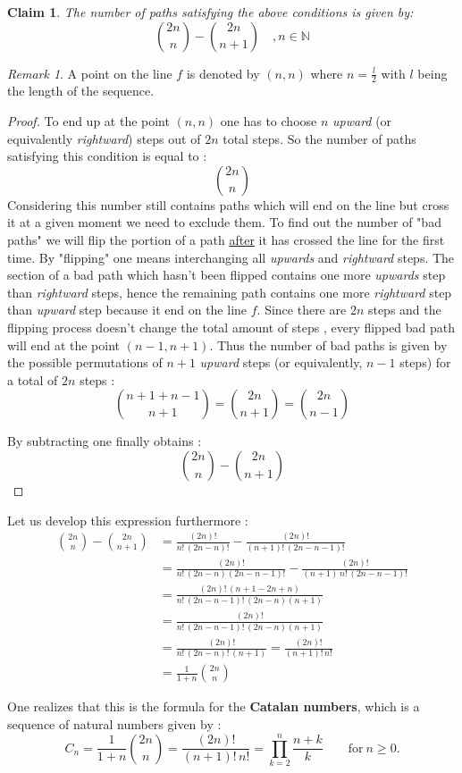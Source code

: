 \documentclass[a4paper,13pt,oneside]{article}
\newtheorem*{claim}{Claim}
\theoremstyle{remark}
\newtheorem*{remark}{Remark}
\begin{document}
\begin{claim} \label{claim}
The number of paths satisfying the above conditions is given by:
\[
\boxed{\binom{2n}{n} - \binom{2n}{n+1}  \quad ,n\in \mathbb{N}}
\]	
\end{claim}
\bigskip
\begin{remark}
A point on the line $f$ is denoted by $(n,n)$ where $n =\frac{l}{2}$ with $l$ being the length of the sequence.
\end{remark}
\bigskip
\begin{proof}
To end up at the point $(n,n)$ one has to choose $n$ \textit{upward} (or equivalently \textit{rightward}) steps out of $2n$ total steps. So the number of paths satisfying this condition is equal to : 
\[\binom{2n}{n}\] 
Considering this number still contains paths which will end on the line but cross it at a given moment we need to exclude them.
To find out the number of "bad paths" we will flip the portion of a path \underline{after}  it has crossed the line for the first time. By "flipping" one means interchanging all  \textit{upwards} and \textit{rightward} steps.
The section of a bad path which hasn't been flipped contains one more \textit{upwards} step than \textit{rightward} steps, hence the remaining path contains one more \textit{rightward} step than \textit{upward} step because it end on the line $f$. Since there are $2n$ steps and the flipping process doesn't change the total amount of steps , every flipped bad path will end at the point $(n-1,n+1)$.
Thus the number of bad paths is given by the possible permutations of $n+1$ \textit{upward} steps (or equivalently, $n-1$  steps)  for a total of $2n$ steps : 
\[
\binom{n+1+n-1}{n+1} =\binom{2n}{n+1}= \binom{2n}{n-1}
\]

By subtracting  one finally obtains :
\[
\binom{2n}{n} - \binom{2n}{n+1}
\]


\end{proof}
\bigskip

Let us develop this expression furthermore :
\begin{align*}
\binom{2n}{n} - \binom{2n}{n+1} &= \frac{(2n)!}{n! \, (2n-n)!} - \frac{(2n)!}{(n+1)! \, (2n-n-1)!}\\
&= \frac{(2n)!}{n! \, (2n-n)(2n-n-1)!} - \frac{(2n)!}{(n+1)\,n! \, (2n-n-1)!}\\
&= \frac{(2n)! \, (n+1-2n+n)}{n!\,(2n-n-1)!\,(2n-n)(n+1)}\\
&=\frac{(2n)!}{n!\,(2n-n-1)!\,(2n-n)(n+1)}\\
&= \frac{(2n)!}{n!\,(2n-n)!\,(n+1)} = \frac{(2n)!}{(n+1)! \,n!}\\
&= \frac{1}{1+n} \binom{2n}{n}
\end{align*}

\begin{flushleft}
One realizes that this is the formula for the \textbf{Catalan numbers}, which is a sequence of natural numbers given by :
\[ 
\boxed{C_n = \frac{1}{1+n} \binom{2n}{n}= \frac{(2n)!}{(n+1)! \,n!}=\prod_{k=2}^{n} \frac{n+k}{k} \qquad \text{for} \:n \geq 0.}
\]
\end{flushleft}
\pagebreak
\end{document}

